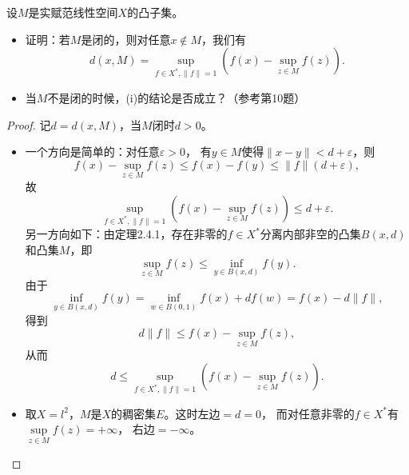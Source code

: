 \begin{11}
    设$M$是实赋范线性空间$X$的凸子集。
    \begin{itemize}
        \item[(i)] 证明：若$M$是闭的，则对任意$x \notin M$，我们有
        \[d(x,M)=\sup_{f \in X^*,\|f\|=1}(f(x)-\sup_{z \in M}f(z)).\]
        \item[(ii)] 当$M$不是闭的时候，(i)的结论是否成立？（参考第10题）
    \end{itemize}
\end{11}
\begin{proof}
    记$d=d(x,M)$，当$M$闭时$d>0$。
    \begin{itemize}
        \item[(i)] 一个方向是简单的：对任意$\varepsilon>0$，
        有$y \in M$使得$\|x-y\|<d+\varepsilon$，则
        \[f(x)-\sup_{z \in M}f(z) \leqslant f(x)-f(y) 
        \leqslant \|f\|(d+\varepsilon),\]
        故\[\sup_{f \in X^*,\|f\|=1}(f(x)-\sup_{z \in M}f(z)) \leqslant d+\varepsilon.\]
        另一方向如下：由定理2.4.1，存在非零的$f \in X^*$分离内部非空的凸集$B(x,d)$和凸集$M$，即
        \[\sup_{z \in M}f(z)\leqslant\inf_{y \in B(x,d)}f(y).\]
        由于\[\inf_{y \in B(x,d)}f(y)=\inf_{w \in B(0,1)}f(x)+df(w)=f(x)-d\|f\|,\]
        得到\[d\|f\| \leqslant f(x)-\sup_{z \in M}f(z),\]
        从而\[d \leqslant \sup_{f \in X^*,\|f\|=1}(f(x)-\sup_{z \in M}f(z)).\]
        \item[(ii)] 取$X=l^2$，$M$是$X$的稠密集$E$。这时左边$=d=0$，
        而对任意非零的$f \in X^*$有$\sup\limits_{z \in M}f(z)=+\infty$，
        右边$=-\infty$。\qedhere
    \end{itemize}
\end{proof}

